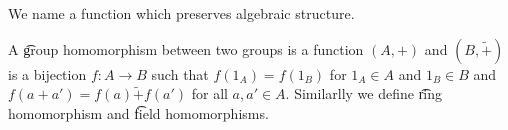 

We name a function which preserves algebraic structure.


A \t{group homomorphism} between two groups is a function
$(A, +)$ and
$(B, \tilde{+})$
is a bijection $f: A \to B$ such that
$f(1_A) = f(1_B)$ for  $1_A \in A$
and $1_B \in B$ and $f(a + a') = f(a) \tilde{+} f(a')$
for all $a, a' \in A$.
Similarlly we define \t{ring homomorphism} and \t{field homomorphisms}.
